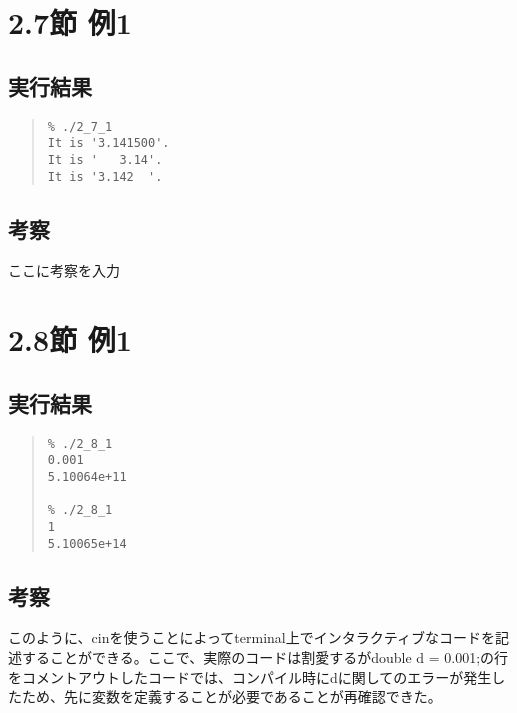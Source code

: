 \documentclass[fontsize=11pt, jafontsize=11pt, paper=a4paper, dvipdfmx]{jlreq}
\begin{document}
\section{2.7節 例1}

\subsection{実行結果}
\label{sec:results6}

\begin{quote}
\begin{verbatim}
% ./2_7_1
It is '3.141500'.
It is '   3.14'.
It is '3.142  '.
\end{verbatim}
\end{quote}
%
\subsection{考察}
ここに考察を入力

\section{2.8節 例1}

\subsection{実行結果}
\label{sec:results7}

\begin{quote}
\begin{verbatim}
% ./2_8_1
0.001
5.10064e+11

% ./2_8_1
1
5.10065e+14
\end{verbatim}
\end{quote}
%
\subsection{考察}
このように、cinを使うことによってterminal上でインタラクティブなコードを記述することができる。ここで、実際のコードは割愛するがdouble d = 0.001;の行をコメントアウトしたコードでは、コンパイル時にdに関してのエラーが発生したため、先に変数を定義することが必要であることが再確認できた。
\end{document}
